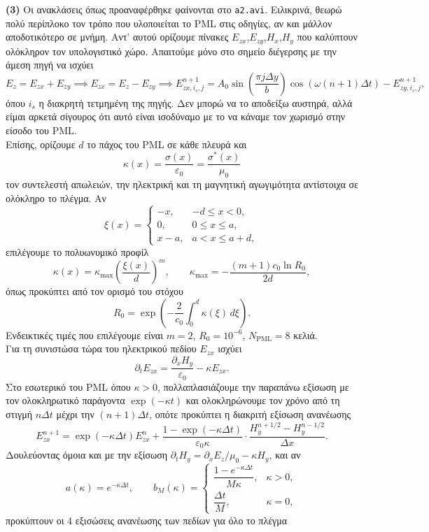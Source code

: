 \documentclass[12pt]{article}
\begin{document}
\textbf{(3)} Οι ανακλάσεις όπως προαναφέρθηκε φαίνονται στο \texttt{a2.avi}. Ειλικρινά, θεωρώ πολύ περίπλοκο τον τρόπο που υλοποιείται το PML στις οδηγίες, αν και μάλλον αποδοτικότερο σε μνήμη. Αντ' αυτού ορίζουμε πίνακες $E_{zx}$,$E_{zy}$,$H_x$,$H_y $ που καλύπτουν ολόκληρον τον υπολογιστικό χώρο. Απαιτούμε μόνο στο σημείο διέγερσης με την άμεση πηγή να ισχύει
$$E_z = E_{zx} + E_{zy}\implies E_{zx} = E_z - E_{zy} \implies
E_{zx,i_s,j}^{n+1}
=
A_0\sin\left(\frac{\pi j\Delta y}{b}\right)
\cos\left(\omega(n+1)\Delta t\right)
-E_{zy,i_s,j}^{n+1},
$$
όπου $i_s$ η διακρητή τετμημένη της πηγής. Δεν μπορώ να το αποδείξω αυστηρά, αλλά είμαι αρκετά σίγουρος ότι αυτό είναι ισοδύναμο με το να κάναμε τον χωρισμό στην είσοδο του PML.\\
Επίσης, ορίζουμε $d$ το πάχος του PML σε κάθε πλευρά και
$$\kappa(x) =
\frac{\sigma(x)}{\varepsilon_0}
=
\frac{\sigma^*(x)}{\mu_0}
$$
τον συντελεστή απωλειών, την ηλεκτρική και τη μαγνητική αγωγιμότητα αντίστοιχα σε ολόκληρο το πλέγμα. Αν
\[
\xi(x)=
\begin{cases}
-x,&-d\le x<0,\\
0,&0\le x\le a,\\
x-a,&a<x\le a+d,
\end{cases}
\] επιλέγουμε το πολυωνυμικό προφίλ
\[
\kappa(x)=\kappa_{\max}\left(\frac{\xi(x)}{d}\right)^m, \qquad
\kappa_{\max}
=-\frac{(m+1)c_0\ln R_0}{2d},
\] όπως προκύπτει από τον ορισμό του στόχου
\[
R_0=
\exp\left(-\frac{2}{c_0}\int_0^d\kappa(\xi)\,d\xi\right).
\]
Ενδεικτικές τιμές που επιλέγουμε είναι $m=2$, $R_0 = 10^{-6}$, $N_\text{PML} = 8$ κελιά.\\
Για τη συνιστώσα τώρα του ηλεκτρικού πεδίου $E_{zx}$ ισχύει
\[
\partial_t E_{zx} = \dfrac{\partial_x H_y}{\varepsilon_0} - \kappa E_{zx}
.\]
Στο εσωτερικό του PML όπου $\kappa > 0$, πολλαπλασιάζουμε την παραπάνω εξίσωση με τον ολοκληρωτικό παράγοντα $\exp(-\kappa t)$ και ολοκληρώνουμε τον χρόνο από τη στιγμή $n \Delta t$ μέχρι την $(n+1)\Delta t$, οπότε προκύπτει η διακριτή εξίσωση ανανέωσης
\[
E_{zx}^{n+1} = \exp(-\kappa \Delta t)E_{zx}^{n} + \dfrac{1-\exp(-\kappa \Delta t)}{\varepsilon_0 \kappa}\cdot \dfrac{H_y^{n+1/2} - H_y^{n-1/2}}{\Delta x}
.\]
Δουλεύοντας όμοια και με την εξίσωση $\partial_t H_y = \partial_x E_z / \mu_0 - \kappa H_y$, και αν
\[
a(\kappa)=e^{-\kappa\Delta t},
\qquad
b_M(\kappa)=
\begin{cases}
\dfrac{1-e^{-\kappa\Delta t}}{M\kappa},&\kappa>0,\\[6pt]
\dfrac{\Delta t}{M},&\kappa=0,
\end{cases}
\]
προκύπτουν οι 4 εξισώσεις ανανέωσης των πεδίων για όλο το πλέγμα
\end{document}
